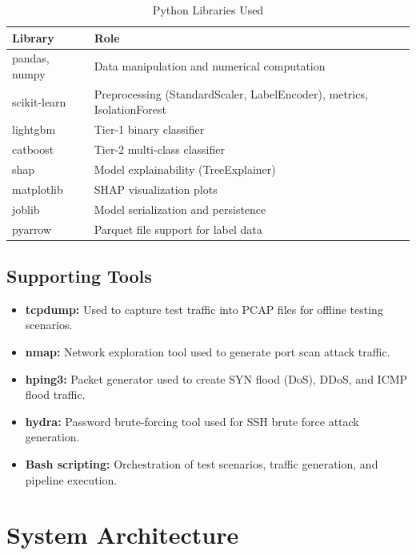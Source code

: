 \documentclass[12pt,a4paper,twoside]{report}
\begin{document}
\begin{table}[H]
\centering
\caption{Python Libraries Used}
\begin{tabularx}{\textwidth}{lX}
\toprule
\textbf{Library} & \textbf{Role} \\
\midrule
pandas, numpy & Data manipulation and numerical computation \\
scikit-learn & Preprocessing (StandardScaler, LabelEncoder), metrics, IsolationForest \\
lightgbm & Tier-1 binary classifier \\
catboost & Tier-2 multi-class classifier \\
shap & Model explainability (TreeExplainer) \\
matplotlib & SHAP visualization plots \\
joblib & Model serialization and persistence \\
pyarrow & Parquet file support for label data \\
\bottomrule
\end{tabularx}
\end{table}

\section{Supporting Tools}

\begin{itemize}
    \item \textbf{tcpdump:} Used to capture test traffic into PCAP files for offline testing scenarios.
    \item \textbf{nmap:} Network exploration tool used to generate port scan attack traffic.
    \item \textbf{hping3:} Packet generator used to create SYN flood (DoS), DDoS, and ICMP flood traffic.
    \item \textbf{hydra:} Password brute-forcing tool used for SSH brute force attack generation.
    \item \textbf{Bash scripting:} Orchestration of test scenarios, traffic generation, and pipeline execution.
\end{itemize}

\chapter{System Architecture}
\end{document}

